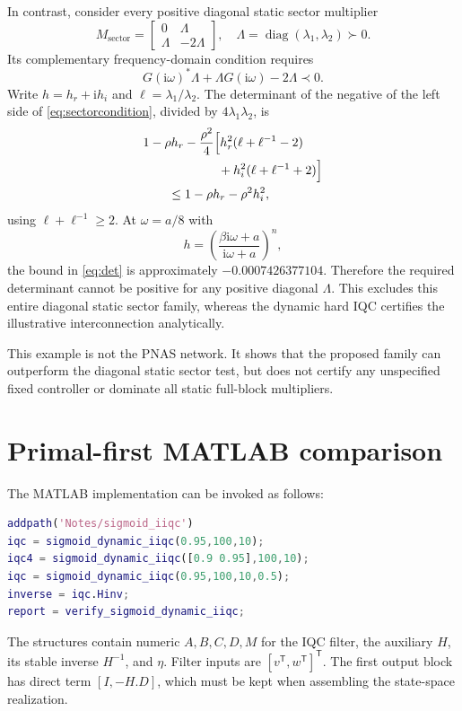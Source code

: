 \documentclass[final,5p,twocolumn]{elsarticle}
\theoremstyle{definition}
\theoremstyle{remark}
\DeclareMathOperator{\diag}{diag}
\newcommand{\T}{\mathsf{T}}
\begin{document}
In contrast, consider every positive diagonal static sector multiplier
\begin{equation}\label{eq:sector}
 M_{\mathrm{sector}}=\begin{bmatrix}0&\Lambda\\\Lambda&-2\Lambda\end{bmatrix},\quad
 \Lambda=\diag(\lambda_1,\lambda_2)\succ0.
\end{equation}
Its complementary frequency-domain condition requires
\begin{equation}\label{eq:sectorcondition}
 G(\mathrm i\omega)^*\Lambda+\Lambda G(\mathrm i\omega)-2\Lambda\prec0.
\end{equation}
Write $h=h_r+\mathrm i h_i$ and $\ell=\lambda_1/\lambda_2$. The determinant of the negative of the left side of \eqref{eq:sectorcondition}, divided by $4\lambda_1\lambda_2$, is
\begin{align}\label{eq:det}
 &1-\rho h_r-\frac{\rho^2}{4}\Big[h_r^2(\ell+\ell^{-1}-2)\notag\\
 &\hspace{6em}+h_i^2(\ell+\ell^{-1}+2)\Big]\notag\\
 &\qquad\le1-\rho h_r-\rho^2h_i^2,
\end{align}
using $\ell+\ell^{-1}\ge2$. At $\omega=a/8$ with
\begin{equation}
 h=\left(\frac{\beta\mathrm i\omega+a}{\mathrm i\omega+a}\right)^n,
\end{equation}
the bound in \eqref{eq:det} is approximately $-0.0007426377104$. Therefore the required determinant cannot be positive for any positive diagonal $\Lambda$. This excludes this entire diagonal static sector family, whereas the dynamic hard IQC certifies the illustrative interconnection analytically.

This example is not the PNAS network. It shows that the proposed family can outperform the diagonal static sector test, but does not certify any unspecified fixed controller or dominate all static full-block multipliers.

\section{Primal-first MATLAB comparison}\label{sec:matlab}
The MATLAB implementation can be invoked as follows:
\begin{lstlisting}[language=Matlab]
addpath('Notes/sigmoid_iiqc')
iqc = sigmoid_dynamic_iiqc(0.95,100,10);
iqc4 = sigmoid_dynamic_iiqc([0.9 0.95],100,10);
iqc = sigmoid_dynamic_iiqc(0.95,100,10,0.5);
inverse = iqc.Hinv;
report = verify_sigmoid_dynamic_iiqc;
\end{lstlisting}
The structures contain numeric $A,B,C,D,M$ for the IQC filter, the auxiliary $H$, its stable inverse $H^{-1}$, and $\eta$. Filter inputs are $[v^{\T},w^{\T}]^{\T}$. The first output block has direct term $[I,-H.D]$, which must be kept when assembling the state-space realization.
\end{document}
